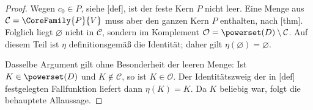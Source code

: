 \documentclass[main.tex]{subfiles}
\begin{document}
\begin{proof}
Wegen \(c_0\in P\), siehe
[def], ist der feste Kern \(P\)
nicht leer. Eine Menge aus \(\mathcal C=\CoreFamily{P}{V}\) muss aber
den ganzen Kern \(P\) enthalten, nach
[thm]. Folglich liegt
\(\varnothing\) nicht in \(\mathcal C\), sondern im Komplement
\(\mathcal O=\powerset(D)\setminus\mathcal C\). Auf diesem Teil ist
\(\eta\) definitionsgemäß die Identität; daher gilt
\(\eta(\varnothing)=\varnothing\).

Dasselbe Argument gilt ohne Besonderheit der leeren Menge: Ist
\(K\in\powerset(D)\) und \(K\notin\mathcal C\), so ist
\(K\in\mathcal O\). Der Identitätszweig der in
[def] festgelegten
Fallfunktion liefert dann \(\eta(K)=K\). Da \(K\) beliebig war, folgt
die behauptete Allaussage.
\end{proof}

\MogTableProofHeading
\begin{tabproofwide}
\end{tabproofwide}
\end{document}
